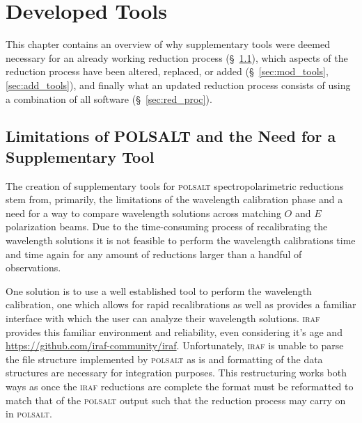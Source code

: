 \chapter{Developed Tools}

This chapter contains an overview of why supplementary tools were deemed necessary for an already working reduction process (\S~\ref{sec:polsalt_limits}), which aspects of the reduction process have been altered, replaced, or added (\S~\ref{sec:mod_tools}, \ref{sec:add_tools}), and finally what an updated reduction process consists of using a combination of all software (\S~\ref{sec:red_proc}).


\section{Limitations of POLSALT and the Need for a Supplementary Tool} \label{sec:polsalt_limits} %


The creation of supplementary tools for \textsc{polsalt} spectropolarimetric reductions stem from, primarily, the limitations of the wavelength calibration phase and a need for a way to compare wavelength solutions across matching $O$ and $E$ polarization beams. Due to the time-consuming process of recalibrating the wavelength solutions it is not feasible to perform the wavelength calibrations time and time again for any amount of reductions larger than a handful of observations.
\prgph

One solution is to use a well established tool to perform the wavelength calibration, one which allows for rapid recalibrations as well as provides a familiar interface with which the user can analyze their wavelength solutions. \textsc{iraf} provides this familiar environment and reliability, even considering it's age and \hyperlink{limited community development}{https://github.com/iraf-community/iraf}. Unfortunately, \textsc{iraf} is unable to parse the file structure implemented by \textsc{polsalt} as is and formatting of the data structures are necessary for integration purposes. This restructuring works both ways as once the \textsc{iraf} reductions are complete the format must be reformatted to match that of the \textsc{polsalt} output such that the reduction process may carry on in \textsc{polsalt}.
\prgph

